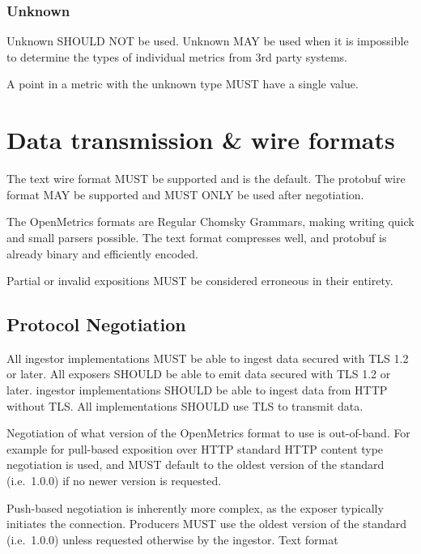 \documentclass[a4paper,12pt,notitlepage,twoside,openright]{article}
\begin{document}
\hypertarget{unknown}{%
\subsubsection{Unknown}\label{unknown}}

Unknown SHOULD NOT be used. Unknown MAY be used when it is impossible to
determine the types of individual metrics from 3rd party systems.

A point in a metric with the unknown type MUST have a single value.

\hypertarget{data-transmission-wire-formats}{%
\section{Data transmission \& wire
formats}\label{data-transmission-wire-formats}}

The text wire format MUST be supported and is the default. The protobuf
wire format MAY be supported and MUST ONLY be used after negotiation.

The OpenMetrics formats are Regular Chomsky Grammars, making writing
quick and small parsers possible. The text format compresses well, and
protobuf is already binary and efficiently encoded.

Partial or invalid expositions MUST be considered erroneous in their
entirety.

\hypertarget{protocol-negotiation}{%
\subsection{Protocol Negotiation}\label{protocol-negotiation}}

All ingestor implementations MUST be able to ingest data secured with
TLS 1.2 or later. All exposers SHOULD be able to emit data secured with
TLS 1.2 or later. ingestor implementations SHOULD be able to ingest data
from HTTP without TLS. All implementations SHOULD use TLS to transmit
data.

Negotiation of what version of the OpenMetrics format to use is
out-of-band. For example for pull-based exposition over HTTP standard
HTTP content type negotiation is used, and MUST default to the oldest
version of the standard (i.e.~1.0.0) if no newer version is requested.

Push-based negotiation is inherently more complex, as the exposer
typically initiates the connection. Producers MUST use the oldest
version of the standard (i.e.~1.0.0) unless requested otherwise by the
ingestor. Text format
\end{document}
